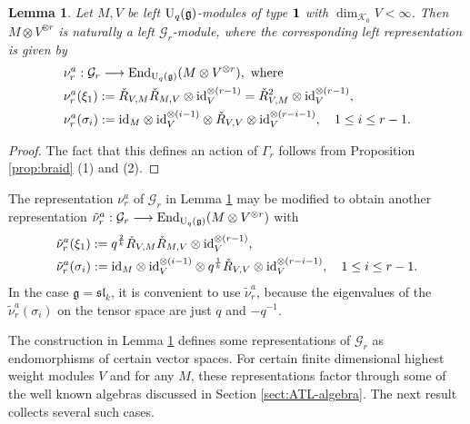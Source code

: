 \documentclass[12pt]{amsart}
\newtheorem{lemma}[theorem]{Lemma}
\theoremstyle{definition}
\theoremstyle{remark}
\numberwithin{equation}{section}
\newcommand{\CG}{{\mathcal G}}
\newcommand{\CK}{{\mathcal K}}
\newcommand{\id}{{\rm{id}}}
\newcommand{\mf}{\mathfrak}
\newcommand{\fg}{{\mf g}}
\newcommand{\inv}{^{-1}}
\newcommand{\U}{{\rm{U}}}
\newcommand{\End}{{\rm{End}}}
\newcommand{\fsl}{{\mathfrak {sl}}}
\begin{document}
\begin{lemma}\label{lem:braid-B-rep}
Let $M, V$ be left $\U_q(\fg)$-modules of type $\bf 1$ with $\dim_{\CK_0} V<\infty$. 
Then
$M\otimes V^{\otimes r}$ is naturally a left $\CG_r$-module, where the corresponding left representation is given by 
\[
\begin{aligned}
 &\nu_r^a:  \CG_r\longrightarrow \End_{\U_q(\fg)}(M\otimes V^{\otimes r}), \text{ where }\\
&\nu_r^a(\xi_1):=\check{R}_{V, M}\check{R}_{M, V}\otimes \id_V^{\otimes (r-1)}=\check{R}_{V, M}^2\otimes \id_V^{\otimes (r-1)}, \\
&\nu_r^a(\sigma_i):=\id_M\otimes \id_V^{\otimes (i-1)}\otimes\check{R}_{V, V}\otimes \id_V^{\otimes (r-i-1)},\quad 1\le i\le r-1.
\end{aligned}
\]
\end{lemma}
\begin{proof} 
The fact that this defines an action of $\Gamma_r$  follows from Proposition \ref{prop:braid} (1) and (2).
\end{proof}

The representation $\nu_r^a$ of $\CG_r$ in Lemma \ref{lem:braid-B-rep} may be modified to obtain another representation
$\tilde\nu_r^a:  \CG_r\longrightarrow \End_{\U_q(\fg)}(M\otimes V^{\otimes r})$ with 
\begin{eqnarray}\label{eq:modified}
\begin{aligned}
&\tilde\nu_r^a(\xi_1):=q^{\frac{2}{k}}\check{R}_{V, M}\check{R}_{M, V}\otimes \id_V^{\otimes (r-1)}, \\
&\tilde\nu_r^a(\sigma_i):=\id_M\otimes \id_V^{\otimes (i-1)}\otimes q^{\frac{1}{k}}\check{R}_{V, V}\otimes \id_V^{\otimes (r-i-1)},\quad 1\le i\le r-1.
\end{aligned}
\end{eqnarray}
In the case $\fg=\fsl_k$, it is convenient to use $\tilde\nu_r^a$, because the eigenvalues of the $\tilde\nu_r^a(\sigma_i)$ 
on the tensor space are just $q$ and $-q\inv$.

The construction in Lemma \ref{lem:braid-B-rep} defines some representations of $\CG_r$ as endomorphisms of  certain
vector spaces. For certain finite dimensional highest weight modules $V$ and for any $M$, these representations 
factor through some of the well known algebras discussed in Section \ref{sect:ATL-algebra}. The next result
collects several such cases.
\end{document}
